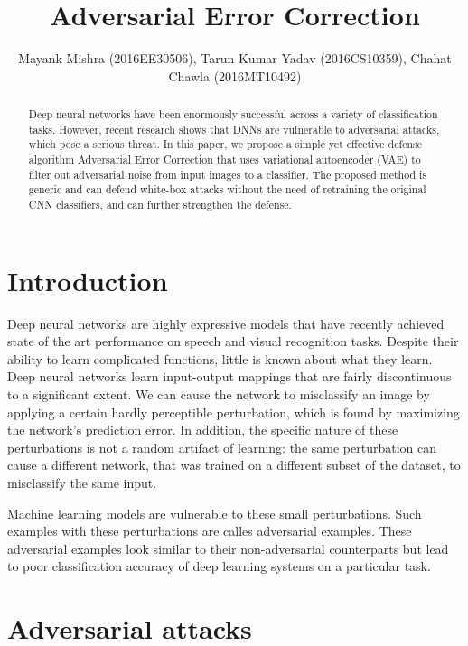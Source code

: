 \documentclass[journal]{IEEEtran}
\begin{document}
\title{Adversarial Error Correction}

\author{Mayank Mishra (2016EE30506), Tarun Kumar Yadav (2016CS10359), Chahat Chawla (2016MT10492)}

\maketitle

\begin{abstract}
Deep neural networks have been enormously successful across a variety of classification tasks. However, recent research shows that DNNs are vulnerable to adversarial attacks, which pose a serious threat. In this paper, we propose a simple yet effective defense algorithm Adversarial Error Correction that uses variational autoencoder (VAE) to filter out adversarial noise from input images to a classifier. The proposed method is generic and can defend white-box attacks without the need of retraining the original CNN classifiers, and can further strengthen the defense.
\end{abstract}

\section{Introduction}
Deep neural networks are highly expressive models that have recently achieved
state of the art performance on speech and visual recognition tasks. Despite their ability to learn complicated functions, little is known about what they learn. Deep neural networks learn input-output mappings that are fairly discontinuous to a significant extent. We can cause the network to misclassify an image by applying a certain hardly perceptible perturbation, which is found by maximizing the network’s prediction error. In addition, the specific nature of these perturbations is not a random artifact of learning: the same perturbation can cause a different network, that was trained on a different subset of the dataset, to misclassify the same input.

Machine learning models are vulnerable to these small perturbations. Such examples with these perturbations are calles adversarial examples. These adversarial examples look similar to their non-adversarial counterparts but lead to poor classification accuracy of deep learning systems on a particular task.

\section{Adversarial attacks}
\end{document}
